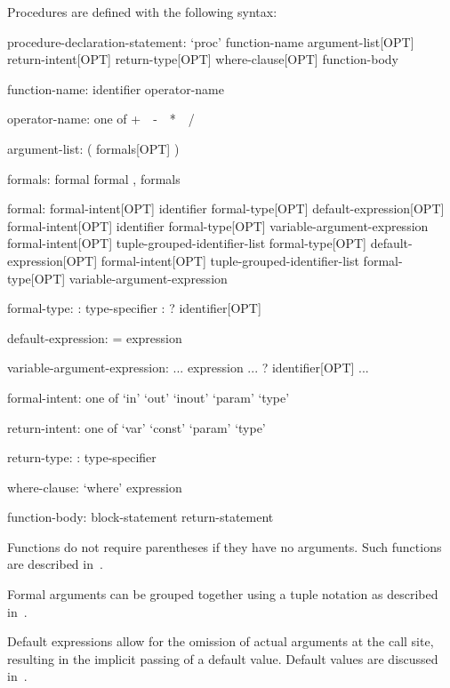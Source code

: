 Procedures are defined with the following syntax:
\begin{syntax}
procedure-declaration-statement:
  `proc' function-name argument-list[OPT] return-intent[OPT] return-type[OPT] where-clause[OPT]
    function-body

function-name:
  identifier
  operator-name


operator-name: one of
  + $ $ $ $ - $ $ $ $ * $ $ $ $ / $ $ $ $ %

argument-list:
  ( formals[OPT] )

formals:
  formal
  formal , formals

formal:
  formal-intent[OPT] identifier formal-type[OPT] default-expression[OPT]
  formal-intent[OPT] identifier formal-type[OPT] variable-argument-expression
  formal-intent[OPT] tuple-grouped-identifier-list formal-type[OPT] default-expression[OPT]
  formal-intent[OPT] tuple-grouped-identifier-list formal-type[OPT] variable-argument-expression

formal-type:
  : type-specifier
  : ? identifier[OPT]

default-expression:
  = expression

variable-argument-expression:
  ... expression
  ... ? identifier[OPT]
  ...

formal-intent: one of
  `in' `out' `inout' `param' `type'

return-intent: one of
  `var' `const' `param' `type'

return-type:
  : type-specifier

where-clause:
  `where' expression

function-body:
  block-statement
  return-statement
\end{syntax}


Functions do not require parentheses if they have no arguments.  Such
functions are described in~.

Formal arguments can be grouped together using a tuple notation as
described in~.

Default expressions allow for the omission of actual arguments at the
call site, resulting in the implicit passing of a default value.
Default values are discussed in~.

